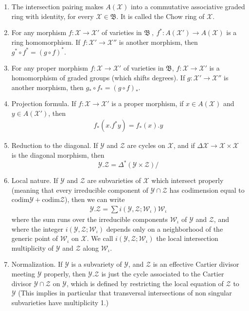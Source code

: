 \documentclass{beamer}
\theoremstyle{plain}
\newcommand{\Dl}{\Delta}
\newcommand{\bean}{\begin{eqnarray*}}
\newcommand{\eean}{\end{eqnarray*}}
\newcommand{\codim}{\mathrm{codim}}
\newcommand{\sX}{\mathcal{X}}       %
\newcommand{\sY}{\mathcal{Y}}       %
\newcommand{\sZ}{\mathcal{Z}}       %
\begin{document}
  \begin{enumerate}
  	\item[A1.] The intersection pairing makes $A\left( \sX\right)$  into a commutative associative 
  	graded ring with identity, for every $\sX \in \mathfrak{B}$. It is called the \alert{ Chow ring} of $\sX$. 
  	\item[A2.] For any morphism $f : \sX \to \sX '$ of varieties in $\mathfrak{B} ~,~ f^*: A(\sX')\to A(\sX)$ is a
  	ring homomorphism. If $f : \sX' \to \sX''$ is another morphism, then $g^* \circ f^* = \left(g \circ f \right)^*$. 
  	\item[A3.] For any proper morphism $f : \sX \to \sX '$ of varieties in $\mathfrak{B}$, $f : \sX \to \sX '$ is a homomorphism of graded groups (which shifts degrees). If 
  	$g : \sX' \to \sX ''$ is another morphism, then  $g_* \circ f_* = \left(g \circ f \right)_*$. 
  	\item[A4.] \alert{ Projection formula}. If $f : \sX \to \sX '$ is a proper morphism, if $x \in  A\left( \sX\right)$  
  	and $y \in  A\left( \sX'\right)$, then 
  	\bean
  	f_*\left(x. f^*y \right) = f_*\left( x\right).y
  	\eean 
  	\item[A5.] \alert{ Reduction to the diagonal}. If $\sY$ and $\sZ$ are cycles on $\sX$, and if $\Dl \sX \to \sX \times \sX$ is the diagonal morphism, then 
  	$$
  	\sY.\sZ = \Dl^*\left(\sY \times \sZ \right)/ 
  	$$
  	\item[A6.] \alert{ Local nature}. If $\sY$ and $\sZ$ are subvarieties of $\sX$ which \alert{ intersect properly} 
  	(meaning that every irreducible component of $\sY \cap \sZ$ has codimension equal 
  	to $\codim \sY + \codim \sZ$), then we can write
  	\bean
  	\sY.\sZ = \sum i\left( \sY, \sZ; \mathcal W_\iota \right) \mathcal W_\iota
  	\eean  
  	where the sum runs over the irreducible components $\mathcal W_\iota$ of $\sY$ and $\sZ$, and where 
  	the integer $i\left( \sY, \sZ; \mathcal W_\iota \right)$ depends only on a neighborhood of the generic point 
  	of $\mathcal W_\iota$ on $\sX$. We call $i\left( \sY, \sZ; \mathcal W_\iota \right)$ the \alert{ local intersection multiplicity} of $\sY$ and $\sZ$
  	along $\mathcal W_\iota$. 
  	\item[A7.] \alert{ Normalization}. If $\sY$ is a subvariety of $\sY$, and $\sZ$ is an effective Cartier 
  	divisor meeting $\sY$ properly, then $\sY.\sZ$ is just the cycle associated to the Cartier 
  	divisor $\sY \cap \sZ$ on $\sY$, which is defined by restricting the local equation of 
  	$\sZ$ to $\sY$ (This implies in particular that transversal intersections of non singular subvarieties have multiplicity 1.) 
  	
  \end{enumerate}
  
\end{document}
